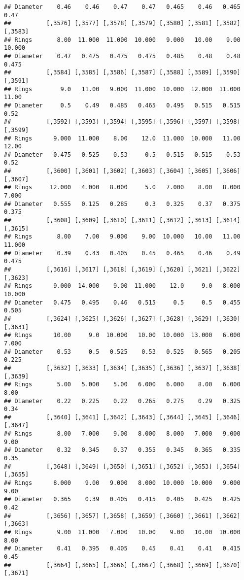 \documentclass[
]{article}
\begin{document}
\begin{verbatim}
## Diameter    0.46    0.46    0.47    0.47   0.465    0.46   0.465    0.47
##          [,3576] [,3577] [,3578] [,3579] [,3580] [,3581] [,3582] [,3583]
## Rings       8.00  11.000  11.000  10.000   9.000   10.00    9.00  10.000
## Diameter    0.47   0.475   0.475   0.475   0.485    0.48    0.48   0.475
##          [,3584] [,3585] [,3586] [,3587] [,3588] [,3589] [,3590] [,3591]
## Rings        9.0   11.00   9.000  11.000  10.000  12.000  11.000   11.00
## Diameter     0.5    0.49   0.485   0.465   0.495   0.515   0.515    0.52
##          [,3592] [,3593] [,3594] [,3595] [,3596] [,3597] [,3598] [,3599]
## Rings      9.000  11.000    8.00    12.0  11.000  10.000   11.00   12.00
## Diameter   0.475   0.525    0.53     0.5   0.515   0.515    0.53    0.52
##          [,3600] [,3601] [,3602] [,3603] [,3604] [,3605] [,3606] [,3607]
## Rings     12.000   4.000   8.000     5.0   7.000    8.00   8.000   7.000
## Diameter   0.555   0.125   0.285     0.3   0.325    0.37   0.375   0.375
##          [,3608] [,3609] [,3610] [,3611] [,3612] [,3613] [,3614] [,3615]
## Rings       8.00    7.00   9.000    9.00  10.000   10.00   11.00  11.000
## Diameter    0.39    0.43   0.405    0.45   0.465    0.46    0.49   0.475
##          [,3616] [,3617] [,3618] [,3619] [,3620] [,3621] [,3622] [,3623]
## Rings      9.000  14.000    9.00  11.000    12.0     9.0   8.000  10.000
## Diameter   0.475   0.495    0.46   0.515     0.5     0.5   0.455   0.505
##          [,3624] [,3625] [,3626] [,3627] [,3628] [,3629] [,3630] [,3631]
## Rings      10.00     9.0  10.000   10.00  10.000  13.000   6.000   7.000
## Diameter    0.53     0.5   0.525    0.53   0.525   0.565   0.205   0.225
##          [,3632] [,3633] [,3634] [,3635] [,3636] [,3637] [,3638] [,3639]
## Rings       5.00   5.000    5.00   6.000   6.000    8.00   6.000    8.00
## Diameter    0.22   0.225    0.22   0.265   0.275    0.29   0.325    0.34
##          [,3640] [,3641] [,3642] [,3643] [,3644] [,3645] [,3646] [,3647]
## Rings       8.00   7.000    9.00   8.000   8.000   7.000   9.000    9.00
## Diameter    0.32   0.345    0.37   0.355   0.345   0.365   0.335    0.35
##          [,3648] [,3649] [,3650] [,3651] [,3652] [,3653] [,3654] [,3655]
## Rings      8.000    9.00   9.000   8.000  10.000  10.000   9.000    9.00
## Diameter   0.365    0.39   0.405   0.415   0.405   0.425   0.425    0.42
##          [,3656] [,3657] [,3658] [,3659] [,3660] [,3661] [,3662] [,3663]
## Rings       9.00  11.000   7.000   10.00    9.00   10.00  10.000    8.00
## Diameter    0.41   0.395   0.405    0.45    0.41    0.41   0.415    0.45
##          [,3664] [,3665] [,3666] [,3667] [,3668] [,3669] [,3670] [,3671]

\end{verbatim}
\end{document}
